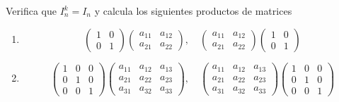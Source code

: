 \begin{ejercicio}
Verifica que $I_n^k=I_n$ y calcula los siguientes productos de matrices

\begin{enumerate}
    \item     $$\left(\begin{array}{cc}
1&0 \\
0&1 
\end{array}\right)
\left(\begin{array}{cc}
a_{11}&a_{12} \\
a_{21}&a_{22} 
\end{array}\right),
\quad
\left(\begin{array}{cc}
a_{11}&a_{12} \\
a_{21}&a_{22} 
\end{array}\right)
\left(\begin{array}{cc}
1&0 \\
0&1 
\end{array}\right)
$$
    \item $$\left(\begin{array}{ccc}
1&0&0  \\
0&1&0  \\
0&0&1
\end{array}\right)
\left(\begin{array}{ccc}
a_{11}& a_{12}& a_{13} \\
a_{21}& a_{22}& a_{23} \\
a_{31}& a_{32}& a_{33}  
\end{array}\right),
\quad
\left(\begin{array}{ccc}
a_{11}& a_{12}& a_{13} \\
a_{21}& a_{22}& a_{23} \\
a_{31}& a_{32}& a_{33}  
\end{array}\right)
\left(\begin{array}{ccc}
1&0&0  \\
0&1&0  \\
0&0&1
\end{array}\right)
$$
\end{enumerate}
       
\end{ejercicio}

